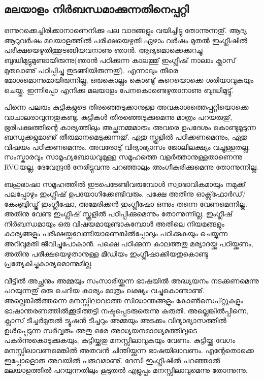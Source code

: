 \subsection*{മലയാളം നിര്‍ബന്ധമാക്കുന്നതിനെപ്പറ്റി }

ഒന്നുറക്കെച്ചിരിക്കാനാണെനിക്കു പല വാദങ്ങളും വയിച്ചിട്ടു തോന്നുന്നതു്.
ആദ്യ ആറുവര്‍ഷം മലയാളത്തില്‍ പരീക്ഷയെഴുതി ഏഴാം വര്‍ഷം മുതല്‍
ഇംഗ്ലീഷില്‍ പരീക്ഷയെഴുതിത്തുടങ്ങിയവനാണു ഞാന്‍. ആദ്യമൊക്കെക്കുറച്ചു
ബുദ്ധിമുട്ടുമുണ്ടായിരുന്നു(ഞാന്‍ പഠിക്കുന്ന കാലത്തു് ഇംഗ്ലീഷ് നാലാം
ക്ലാസ് മുതലാണു് പഠിപ്പിച്ചു തുടങ്ങിയിരുന്നതു്). എന്നാലും തീരെ
മോശമൊന്നുമായിരുന്നില്ല, ഒരുകൊല്ലം കൊണ്ടു് കുറെയൊക്കെ ശരിയാവുകയും
ചെയ്തു. ഇന്നിപ്പോ എനിക്കു മലയാളം പേനകൊണ്ടെഴുതാനാണു ബുദ്ധിമുട്ടു്.

പിന്നെ പലരും കുട്ടികളുടെ തിരഞ്ഞെടുക്കാനുള്ള അവകാശത്തെപ്പറ്റിയൊക്കെ
വാചാലരാവുന്നതുകണ്ടു. കുട്ടികള്‍ തിരഞ്ഞെടുക്കുമെന്നു മാത്രം പറയരുതു്,
ഭൂരിപക്ഷത്തിന്റെ കാര്യത്തിലും അച്ഛനമ്മമാരും അവരെ ഉപദേശം കൊണ്ടുമൂടുന്ന
ബന്ധുക്കളുമാണു് തീരുമാനമെടുക്കുന്നതു്. ഏതു സ്കൂളില്‍ പഠിക്കണമെന്നും,
ഏതു വിഷയം പഠിക്കണമെന്നും. അവരോടു് വിദ്യാഭ്യാസം ജോലിലക്ഷ്യം
വച്ചുള്ളതല്ല, സംസ്കാരവും സാമൂഹ്യബോധവുമുള്ള സമൂഹത്തെ
വളര്‍ത്താനുള്ളതാണെന്നു RVGയല്ല, ദേവേന്ദ്രന്‍ നേരിട്ടുവന്നു പറഞ്ഞാലും
അംഗീകരിക്കുമെന്നു തോന്നുന്നില്ല.

ബഹുഭാഷാ സമൂഹത്തില്‍ ഇടപെടേണ്ടിവരുമ്പോള്‍ സ്വാഭാവികമായും നമുക്ക്
പലപ്പോഴും ഇംഗ്ലീഷ് ഉപയോഗിക്കേണ്ടിവരും. പക്ഷേ അതിനു
ഓക്സ്‌ഫോര്‍ഡ്/കേംബ്രിഡ്ജ് ഇംഗ്ലീഷോ, അമേരിക്കന്‍ ഇംഗ്ലീഷോ ഒന്നും തന്നെ
വേണമെന്നില്ല. അതിനു വേണ്ട ഇംഗ്ലീഷ് സ്കൂളില്‍ പഠിപ്പിക്കുമെന്നും
തോന്നുന്നില്ല. ഇംഗ്ലീഷ് നിര്‍ബന്ധമായും ഒരു വിഷയമായുണ്ടാകുമ്പോള്‍ അതിലെ
നിയമങ്ങളും കാര്യങ്ങളും പരീക്ഷയ്ക്കുവേണ്ടിയാണെങ്കില്‍പ്പോലും
പഠിക്കുകയും ചെയ്യുന്ന അറിവുമതി ജീവിച്ചുപോകാന്‍. പക്ഷെ പഠിക്കുന്ന
കാലത്തതു മര്യാദയ്ക്കു പഠിയ്ക്കണം, അതിനു പരീക്ഷയെഴുതാനുള്ള മീഡിയം
ഇംഗ്ലീഷാക്കിയതുകൊണ്ടു പ്രത്യേകിച്ചുകാര്യമൊന്നുമില്ല.

വീട്ടില്‍ അച്ഛനും അമ്മയും സംസാരിയ്ക്കുന്ന ഭാഷയില്‍ അദ്ധ്യയനം
നടക്കണമെന്നു പറയുന്നതു് ഒരു ചെറിയ കാര്യം മാത്രം ലക്ഷ്യം
വച്ചുകൊണ്ടാണു്. അല്ലെങ്കില്‍ത്തന്നെ മനസ്സിലാവാത്ത സിദ്ധാന്തങ്ങളും
കോണ്‍സെപ്റ്റുകളും ഭാഷാന്തരണത്തില്‍ക്കൂടിത്തട്ടി നഷ്ടപ്പെടരുതെന്നു
കരുതി. അല്ലെങ്കില്‍പ്പിന്നെ, ക്ലാസ് ടീച്ചര്‍മുതല്‍ ട്യൂഷന്‍ ടീച്ചറും
അമ്മയും അടക്കം വിദ്യാഭ്യാസത്തില്‍ ഉള്‍പ്പെടുന്ന സര്‍വ്വരും അതു ഒരേ
അദ്ധ്യയനമാദ്ധ്യമത്തിലൂടെ പകര്‍ന്നുകൊടുക്കുകയും, കുട്ടിയ്ക്കതു
മനസ്സിലാവുകയും വേണം. കുട്ടിയ്ക്കു വേഗം മനസ്സിലാവണമെങ്കില്‍ അതവന്‍
ചിന്തിയ്ക്കുന്ന ഭാഷയിലാവണം. എന്റേതൊക്കെ ഇപ്പോളൊരു അവയില്‍ പരുവമാണു്.
ദേസി ഇംഗ്ലീഷില്‍ പറഞ്ഞാല്‍ മലയാളത്തില്‍ പറയുന്നതിലും കൂടുതല്‍ എളുപ്പം
മനസ്സിലാവുമെന്നു തോന്നുന്നു.

